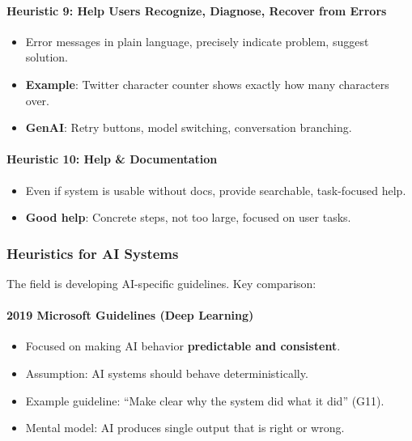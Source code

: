 \paragraph*{Heuristic 9: Help Users Recognize, Diagnose, Recover from Errors}
\begin{itemize}
  \item Error messages in plain language, precisely indicate problem, suggest solution.
  \item \textbf{Example}: Twitter character counter shows exactly how many characters over.
  \item \textbf{GenAI}: Retry buttons, model switching, conversation branching.
\end{itemize}

\paragraph*{Heuristic 10: Help \& Documentation}
\begin{itemize}
  \item Even if system is usable without docs, provide searchable, task-focused help.
  \item \textbf{Good help}: Concrete steps, not too large, focused on user tasks.
\end{itemize}

\subsubsection*{Heuristics for AI Systems}

The field is developing AI-specific guidelines. Key comparison:

\paragraph*{2019 Microsoft Guidelines (Deep Learning)}
\begin{itemize}
  \item Focused on making AI behavior \textbf{predictable and consistent}.
  \item Assumption: AI systems should behave deterministically.
  \item Example guideline: ``Make clear why the system did what it did'' (G11).
  \item Mental model: AI produces single output that is right or wrong.
\end{itemize}


